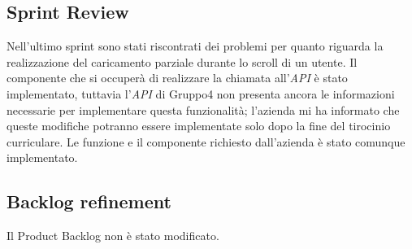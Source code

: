 \subsection{Sprint Review}
Nell'ultimo sprint sono stati riscontrati dei problemi per quanto riguarda la realizzazione del caricamento parziale durante lo scroll di un utente. Il componente che si occuperà di realizzare la chiamata all'\emph{API} è stato implementato, tuttavia l'\emph{API} di Gruppo4 non presenta ancora le informazioni necessarie per implementare questa funzionalità; l'azienda mi ha informato che queste modifiche potranno essere implementate solo dopo la fine del tirocinio curriculare. Le funzione e il componente richiesto dall'azienda è stato comunque implementato.

\subsection{Backlog refinement}
Il Product Backlog non è stato modificato.
